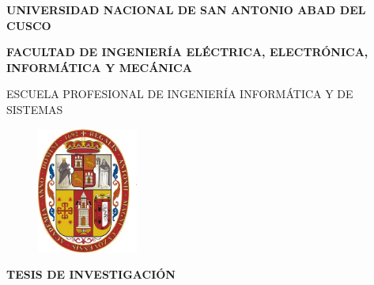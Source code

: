 \documentclass[12pt]{report}
\begin{document}
\sloppy
\renewcommand\bibname{BIBLIOGRAFÍA}

\thispagestyle{empty} %

\begin{center} {\large \bf UNIVERSIDAD NACIONAL DE SAN ANTONIO ABAD DEL CUSCO} \end{center}
\begin{center} {\large \bf FACULTAD DE INGENIERÍA ELÉCTRICA, ELECTRÓNICA, INFORMÁTICA Y MECÁNICA} \end{center}
\begin{center} {\large  ESCUELA PROFESIONAL DE INGENIERÍA INFORMÁTICA Y DE SISTEMAS} \end{center}
\vspace{0.5cm}
\begin{figure}[htb]
\centering
\includegraphics[width=33mm]{Imagenes/simbolo_unsaac.png}
\end{figure}
\vspace{0.5cm}
\begin{center} {\large \textbf{TESIS DE INVESTIGACIÓN}} \end{center}
\vspace{0.5cm}
\end{document}
